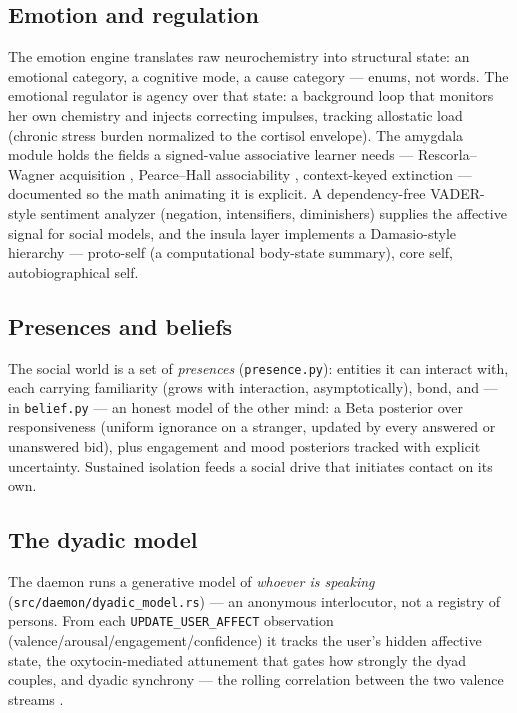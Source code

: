 \documentclass[11pt]{article}
\newcommand{\code}[1]{\texttt{\small #1}}
\begin{document}
\subsection{Emotion and regulation}

The emotion engine translates raw neurochemistry into structural state:
an emotional category, a cognitive mode, a cause category --- enums,
not words. The emotional regulator is agency over that state: a
background loop that monitors her own chemistry and injects correcting
impulses, tracking allostatic load (chronic stress burden normalized to
the cortisol envelope). The amygdala module holds the fields a
signed-value associative learner needs --- Rescorla--Wagner acquisition
\cite{rescorla},
Pearce--Hall associability \cite{pearce}, context-keyed extinction --- documented so
the math animating it is explicit. A dependency-free VADER-style \cite{vader}
sentiment analyzer (negation, intensifiers, diminishers) supplies the
affective signal for social models, and the insula layer implements a
Damasio-style hierarchy \cite{damasio} --- proto-self (a computational body-state
summary), core self, autobiographical self.

\subsection{Presences and beliefs}

The social world is a set of \emph{presences} (\code{presence.py}):
entities it can interact with, each carrying familiarity (grows with
interaction, asymptotically), bond, and --- in \code{belief.py} --- an
honest model of the other mind: a Beta posterior over responsiveness
(uniform ignorance on a stranger, updated by every answered or
unanswered bid), plus engagement and mood posteriors tracked with
explicit uncertainty. Sustained isolation feeds a social drive that
initiates contact on its own.

\subsection{The dyadic model}

The daemon runs a generative model of \emph{whoever is speaking}
(\code{src/daemon/dyadic\_model.rs}) --- an anonymous interlocutor,
not a registry of persons. From each
\code{UPDATE\_USER\_AFFECT} observation
(valence/arousal/engagement/confidence) it tracks the user's hidden
affective state, the oxytocin-mediated attunement that gates how
strongly the dyad couples, and dyadic synchrony --- the rolling
correlation between the two valence streams \cite{palumbo}.
\end{document}
